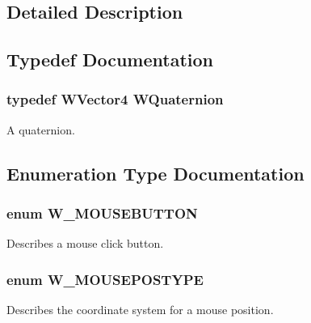 \subsection{Detailed Description}


\subsection{Typedef Documentation}
\subsubsection[{\texorpdfstring{W\+Quaternion}{WQuaternion}}]{\setlength{\rightskip}{0pt plus 5cm}typedef {\bf W\+Vector4} {\bf W\+Quaternion}}\hypertarget{group__engineclass_ga717cc687f6844e7a4a2de4948b96c6ef}{}\label{group__engineclass_ga717cc687f6844e7a4a2de4948b96c6ef}
A quaternion. 

\subsection{Enumeration Type Documentation}
\subsubsection[{\texorpdfstring{W\+\_\+\+M\+O\+U\+S\+E\+B\+U\+T\+T\+ON}{W_MOUSEBUTTON}}]{\setlength{\rightskip}{0pt plus 5cm}enum {\bf W\+\_\+\+M\+O\+U\+S\+E\+B\+U\+T\+T\+ON}}\hypertarget{group__engineclass_ga9e78ddd4770694b21c0d4b852e9c800e}{}\label{group__engineclass_ga9e78ddd4770694b21c0d4b852e9c800e}
Describes a mouse click button. 
\subsubsection[{\texorpdfstring{W\+\_\+\+M\+O\+U\+S\+E\+P\+O\+S\+T\+Y\+PE}{W_MOUSEPOSTYPE}}]{\setlength{\rightskip}{0pt plus 5cm}enum {\bf W\+\_\+\+M\+O\+U\+S\+E\+P\+O\+S\+T\+Y\+PE}}\hypertarget{group__engineclass_ga6b8628ac07d789a9caf635eb23728d04}{}\label{group__engineclass_ga6b8628ac07d789a9caf635eb23728d04}
Describes the coordinate system for a mouse position. 